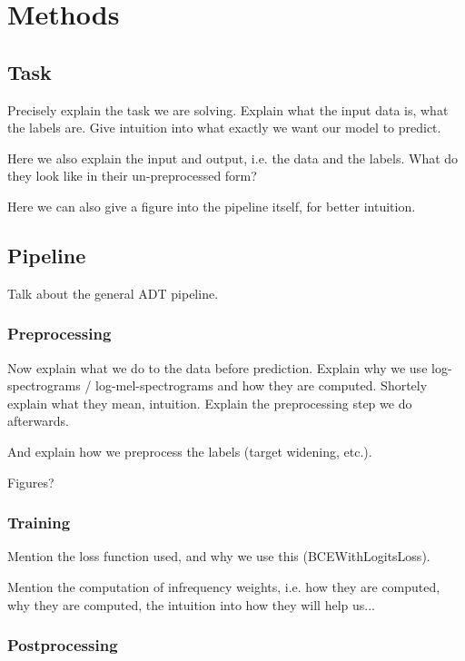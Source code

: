 \chapter{Methods}

\section{Task}

Precisely explain the task we are solving. Explain what the input data is, what the labels are.
Give intuition into what exactly we want our model to predict.

Here we also explain the input and output, i.e. the data and the labels.
What do they look like in their un-preprocessed form?

Here we can also give a figure into the pipeline itself, for better intuition.

\section{Pipeline}

Talk about the general \gls{ADT} pipeline.

\subsection{Preprocessing}

Now explain what we do to the data before prediction.
Explain why we use log-spectrograms / log-mel-spectrograms and how they are computed.
Shortely explain what they mean, intuition.
Explain the preprocessing step we do afterwards.

And explain how we preprocess the labels (target widening, etc.).

Figures?

\subsection{Training}

Mention the loss function used, and why we use this (BCEWithLogitsLoss).

Mention the computation of infrequency weights, i.e. how they are computed, why they are computed, the intuition into how they will help us...

\subsection{Postprocessing}

